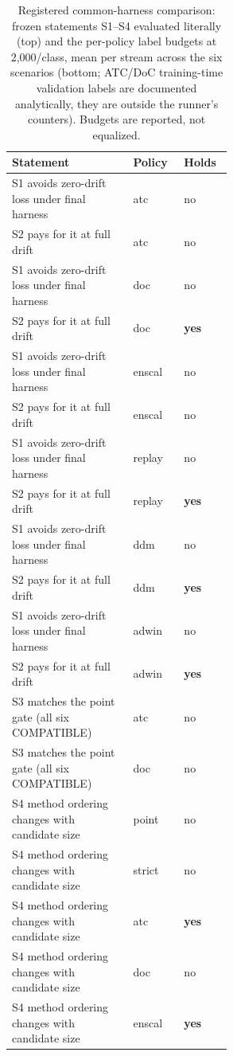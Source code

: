 \begin{table}[t]
\centering
\caption{Registered common-harness comparison: frozen statements S1--S4 evaluated literally
(top) and the per-policy label budgets at 2{,}000/class, mean per stream across the six
scenarios (bottom; ATC/DoC training-time validation labels are documented analytically, they
are outside the runner's counters). Budgets are reported, not equalized.}
\label{tab:common_harness_supp_statements}
\scriptsize
\begin{tabular}{p{0.55\linewidth} l l}
\toprule
Statement & Policy & Holds \\
\midrule
S1 avoids zero-drift loss under final harness & atc & no \\
S2 pays for it at full drift & atc & no \\
S1 avoids zero-drift loss under final harness & doc & no \\
S2 pays for it at full drift & doc & \textbf{yes} \\
S1 avoids zero-drift loss under final harness & enscal & no \\
S2 pays for it at full drift & enscal & no \\
S1 avoids zero-drift loss under final harness & replay & no \\
S2 pays for it at full drift & replay & \textbf{yes} \\
S1 avoids zero-drift loss under final harness & ddm & no \\
S2 pays for it at full drift & ddm & \textbf{yes} \\
S1 avoids zero-drift loss under final harness & adwin & no \\
S2 pays for it at full drift & adwin & \textbf{yes} \\
S3 matches the point gate (all six COMPATIBLE) & atc & no \\
S3 matches the point gate (all six COMPATIBLE) & doc & no \\
S4 method ordering changes with candidate size & point & no \\
S4 method ordering changes with candidate size & strict & no \\
S4 method ordering changes with candidate size & atc & \textbf{yes} \\
S4 method ordering changes with candidate size & doc & no \\
S4 method ordering changes with candidate size & enscal & \textbf{yes} \\
\bottomrule
\end{tabular}


\end{table}
